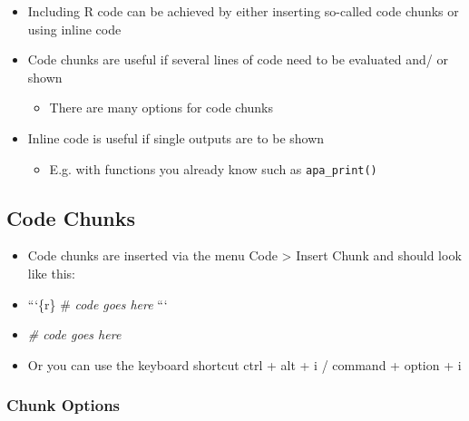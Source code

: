 \documentclass[
]{book}
\newenvironment{Shaded}{\begin{snugshade}}{\end{snugshade}}
\newcommand{\CommentTok}[1]{\textcolor[rgb]{0.56,0.35,0.01}{\textit{#1}}}
\providecommand{\tightlist}{%
  \setlength{\itemsep}{0pt}\setlength{\parskip}{0pt}}
\begin{document}
\begin{itemize}
\tightlist
\item
  Including R code can be achieved by either inserting so-called code chunks or using inline code
\item
  Code chunks are useful if several lines of code need to be evaluated and/ or shown

  \begin{itemize}
  \tightlist
  \item
    There are many options for code chunks
  \end{itemize}
\item
  Inline code is useful if single outputs are to be shown

  \begin{itemize}
  \tightlist
  \item
    E.g. with functions you already know such as \texttt{apa\_print()}
  \end{itemize}
\end{itemize}

\subsection{Code Chunks}\label{code-chunks}

\begin{itemize}
\item
  Code chunks are inserted via the menu Code \textgreater{} Insert Chunk and should look like this:
\item
  ```\{r\}
  \# \emph{code goes here}
  ```
\item
\begin{Shaded}
\begin{Highlighting}[]
\CommentTok{\# code goes here}
\end{Highlighting}
\end{Shaded}
\item
  Or you can use the keyboard shortcut ctrl + alt + i / command + option + i
\end{itemize}

\subsubsection*{Chunk Options}\label{chunk-options}
\end{document}
